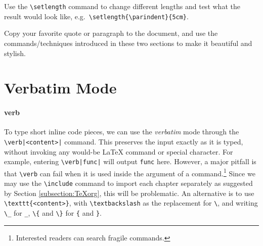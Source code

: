 \begin{exercisebox}
\begin{Exercise}
Use the \texttt{\textbackslash setlength} command to change different lengths and test what the result would look like, e.g.\ \texttt{\textbackslash setlength\{\textbackslash parindent\}\{5cm\}}.
\end{Exercise}
\begin{Exercise}
Copy your favorite quote or paragraph to the document, and use the commands/techniques introduced in these two sections to make it beautiful and stylish.    
\end{Exercise}
\end{exercisebox}

\section{Verbatim Mode}

\paragraph{verb}
To type short inline code pieces, we can use the \textit{verbatim} mode through the \texttt{\textbackslash verb|<content>|} command. This preserves the input exactly as it is typed, without invoking any would-be \LaTeX{} command or special character. For example, entering \texttt{\textbackslash verb|func|} will output \verb|func| here. However, a major pitfall is that \texttt{\textbackslash verb} can fail when it is used inside the argument of a command.\footnote{Interested readers can search fragile commands.} Since we may use the \texttt{\textbackslash include} command to import each chapter separately as suggested by Section \ref{subsection:TeXorg}, this will be problematic. An alternative is to use \texttt{\textbackslash texttt\{<content>\}}, with \texttt{\textbackslash textbackslash} as the replacement for \texttt{\textbackslash}, and writing \texttt{\textbackslash \_} for \texttt{\_}, \texttt{\textbackslash \{} and \texttt{\textbackslash \}} for \texttt{\{} and \texttt{\}}. 

